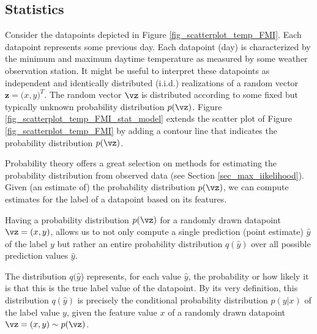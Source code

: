 \documentclass[12pt]{report}
\begin{document}
\subsection{Statistics}


Consider the datapoints depicted in Figure \ref{fig_scatterplot_temp_FMI}. 
Each datapoint represents some previous day. Each datapoint (day) 
is characterized by the minimum and maximum daytime temperature 
as measured by some weather observation station. It might 
be useful to interpret these datapoints as independent and 
identically distributed (i.i.d.) realizations of a random vector 
$\mathbf{z} =\big(x,y\big)^{T}$. The random vector $\vz$ 
is distributed according to some fixed but typically unknown 
probability distribution $p(\vz)$. Figure \ref{fig_scatterplot_temp_FMI_stat_model} 
extends the scatter plot of Figure \ref{fig_scatterplot_temp_FMI} 
by adding a contour line that indicates the probability distribution $p(\vz)$. 

Probability theory offers a great selection on methods for 
estimating the probability distribution from observed data 
(see Section \ref{sec_max_iikelihood}). Given (an estimate of) 
the probability distribution $p(\vz)$, we can compute estimates 
for the label of a datapoint based on its features. 

Having a probability distribution $p(\vz)$ for a randomly 
drawn datapoint $\vz=(x,y)$, allows us to not only compute 
a single prediction (point estimate) $\hat{y}$ of the label $y$ 
but rather an entire probability distribution $q(\hat{y})$ over 
all possible prediction values $\hat{y}$. 

The distribution $q(\hat{y}$) represents, for each value $\hat{y}$, 
the probability or how likely it is that this is the true label value of 
the datapoint. By its very definition, this distribution $q(\hat{y})$ 
is precisely the conditional probability distribution $p(y|x)$ of the 
label value $y$, given the feature value $x$ of a randomly drawn 
datapoint $\vz=(x,y) \sim p(\vz)$. 
\end{document}
